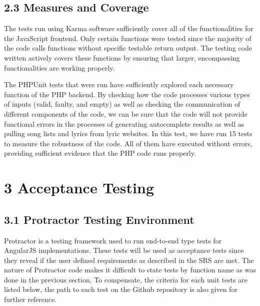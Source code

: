 \documentclass[]{article}
\begin{document}
\subsection{\textbf{2.3 Measures and
Coverage}}\label{measures-and-coverage}

The tests run using Karma software sufficiently cover all of the
functionalities for the JavaScript frontend. Only certain functions were
tested since the majority of the code calls functions without specific
testable return output. The testing code written actively covers these
functions by ensuring that larger, encompassing functionalities are
working properly.

The PHPUnit tests that were run have sufficiently explored each
necessary function of the PHP backend. By checking how the code
processes various types of inputs (valid, faulty, and empty) as well as
checking the communication of different components of the code, we can
be sure that the code will not provide functional errors in the
processes of generating autocomplete results as well as pulling song
lists and lyrics from lyric websites. In this test, we have run 15 tests
to measure the robustness of the code. All of them have executed without
errors, providing sufficient evidence that the PHP code runs properly.

\section{\textbf{3 Acceptance Testing}}\label{acceptance-testing}

\subsection{\textbf{3.1 Protractor Testing
Environment}}\label{protractor-testing-environment}

Protractor is a testing framework used to run end-to-end type tests for
AngularJS implementations. These tests will be used as acceptance tests
since they reveal if the user defined requirements as described in the
SRS are met. The nature of Protractor code makes it difficult to state
tests by function name as was done in the previous section. To
compensate, the criteria for each unit tests are listed below, the path
to each test on the Github repository is also given for further
reference.
\end{document}
